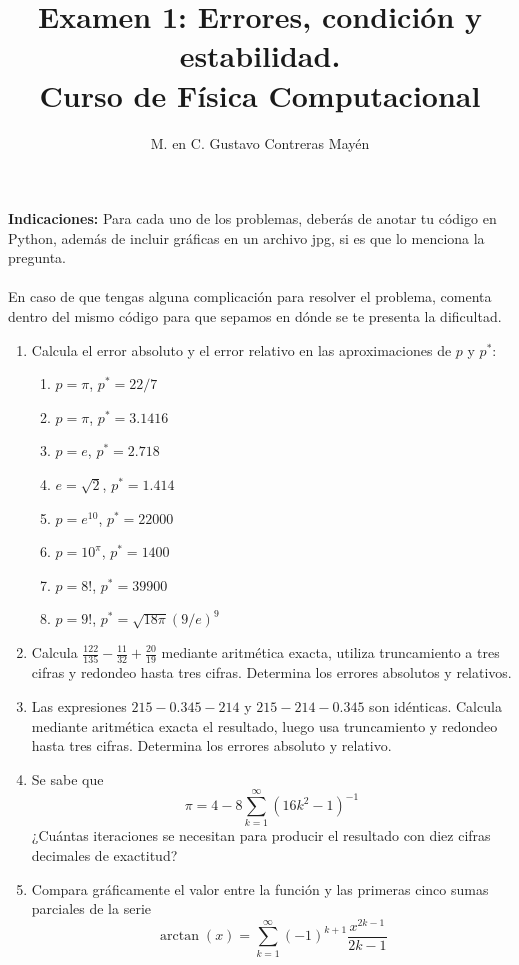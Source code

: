\documentclass[11pt]{article}
\title{Examen 1: Errores, condición y estabilidad. \\ Curso de Física Computacional}
\author{M. en C. Gustavo Contreras Mayén}
\date{ }
\begin{document}
\maketitle
\fontsize{14}{14}\selectfont
\textbf{Indicaciones: } Para cada uno de los problemas, deber\'{a}s de anotar tu c\'{o}digo en Python, adem\'{a}s de incluir gr\'{a}ficas en un archivo jpg, si es que lo menciona la pregunta.
\\
\\
En caso de que tengas alguna complicaci\'{o}n para resolver el problema, comenta dentro del mismo c\'{o}digo para que sepamos en d\'{o}nde se te presenta la dificultad.
\begin{enumerate}
\item Calcula el error absoluto y el error relativo en las aproximaciones de $p$ y $p^{*}$:
\begin{multicols}{2}
\begin{enumerate}
\item $p = \pi$, $p^{*} = 22/7$
\item $p = \pi$, $p^{*} = 3.1416$
\item $p = e$, $p^{*} = 2.718$
\item $e = \sqrt{2}$, $p^{*} = 1.414$
\item $p= e^{10}$, $p^{*} = 22000$
\item $p= 10^{\pi}$, $p^{*} = 1400$
\item $p = 8!$, $p^{*}=39900$
\item $p = 9!$, $p^{*}= \sqrt{18 \pi} (9/e)^{9}$
\end{enumerate}
\end{multicols}
\item Calcula $\frac{122}{135} - \frac{11}{32} + \frac{20}{19}$ mediante aritmética exacta, utiliza truncamiento a tres cifras y redondeo hasta tres cifras. Determina los errores absolutos y relativos.
\item Las expresiones $215 -0.345-214$ y $215-214-0.345$ son idénticas. Calcula mediante aritmética exacta el resultado, luego usa truncamiento y redondeo hasta tres cifras. Determina los errores absoluto y relativo. 
\item Se sabe que
\[ \pi = 4 - 8 \sum_{k=1}^{\infty} \left( 16 k^{2} - 1 \right)^{-1} \]
¿Cu\'{a}ntas iteraciones se necesitan para producir el resultado con diez cifras decimales de exactitud?
\item Compara gr\'{a}ficamente el valor entre la funci\'{o}n y las primeras cinco sumas parciales de la serie
\[ \arctan(x) = \sum_{k=1}^{\infty} (-1)^{k+1} \dfrac{x^{2k-1}}{2k-1}\]

\end{enumerate}
\end{document}
